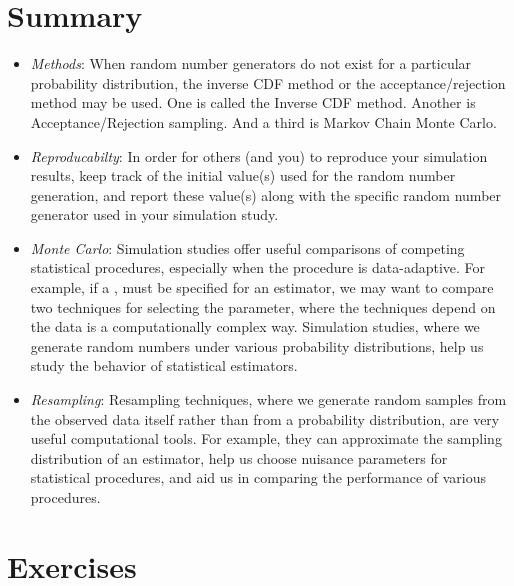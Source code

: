 \section{Summary}
\begin{itemize}
\item 
\textit{Methods}: When random number generators do not exist for a particular probability
distribution, the inverse CDF method or the acceptance/rejection method
may be used. One is called the Inverse CDF method.
Another is Acceptance/Rejection sampling.  And a third is Markov Chain
Monte Carlo.

\item
\textit{Reproducabilty}: In order for others (and you) to reproduce your simulation results,
keep track of the initial value(s) used for the random number
generation, and report these value(s)
along with the specific random number generator used in your
simulation study.

\item
\textit{Monte Carlo}: Simulation studies offer useful comparisons of competing statistical
procedures, especially when the procedure is data-adaptive. For
example, if a ,
must be specified for an estimator, we may want to compare
two techniques for selecting the parameter, where the techniques
depend on the data is a computationally complex way.  
Simulation studies, where we generate random numbers under various probability
distributions, help us study the behavior of statistical estimators.

\item
\textit{Resampling}: Resampling techniques, where we generate random samples from the observed data
itself rather than from a probability distribution, are very useful computational tools.
For example, they can approximate the sampling distribution of an estimator,
help us choose nuisance parameters for statistical procedures, and 
aid us in comparing the performance of various procedures.

\end{itemize}

\section{Exercises}


